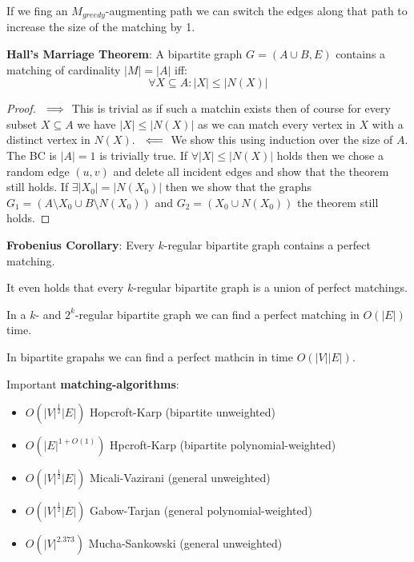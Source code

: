 \begin{remark}
    If we fing an $M_{greedy}$-augmenting path we can switch the edges along that path to increase the size of the matching by 1.
\end{remark}

\begin{theorem}
    \textbf{Hall's Marriage Theorem}: A bipartite graph $G = (A \cup B, E)$ contains a matching of cardinality $|M|=|A|$ iff:
    $$\forall X \subseteq A : |X| \le |N(X)|$$
\end{theorem}

\begin{proof}
    $\\\implies$
    This is trivial as if such a matchin exists then of course for every subset $X \subseteq A$ we have $|X| \le |N(X)|$ as we can  match every vertex in $X$ with a distinct vertex in $N(X)$.
    $\\\impliedby$
    We show this using induction over the size of $A$. The BC is $\mid A \mid = 1$ is trivially true. 
    If $\forall |X| \le |N(X)|$ holds then we chose a random edge $(u, v)$  and delete all incident edges and show that the theorem still holds. 
    If $\exists |X_0| = |N(X_0)|$ then we show that the graphs $G_1 = (A\setminus X_0 \cup B\setminus N(X_0))$ and $G_2 = (X_0 \cup N(X_0))$ the theorem still holds.
\end{proof}

\begin{theorem}
    \textbf{Frobenius Corollary}: Every $k$-regular bipartite graph contains a perfect matching.
\end{theorem}

\begin{remark}
    It even holds that every $k$-regular bipartite graph is a union of perfect matchings.
\end{remark}

\begin{theorem}
    In a $k$- and $2^k$-regular bipartite graph we can find a perfect matching in $O(|E|)$ time.
\end{theorem}

\begin{theorem}
    In bipartite grapahs we can find a perfect mathcin in time $O(|V| |E|)$.
\end{theorem}

\begin{remark}
    Important \textbf{matching-algorithms}:
    \begin{itemize}
        \item $O({|V|}^{\frac{1}{2}}|E|)$ Hopcroft-Karp (bipartite unweighted)
        \item $O({|E|}^{1+O(1)})$ Hpcroft-Karp (bipartite polynomial-weighted)
        \item $O({|V|}^{\frac{1}{2}}|E|)$ Micali-Vazirani (general unweighted)
        \item $O({|V|}^{\frac{1}{2}}|E|)$ Gabow-Tarjan (general polynomial-weighted)
        \item $O({|V|}^{2.373})$ Mucha-Sankowski (general unweighted)
    \end{itemize}
\end{remark}

